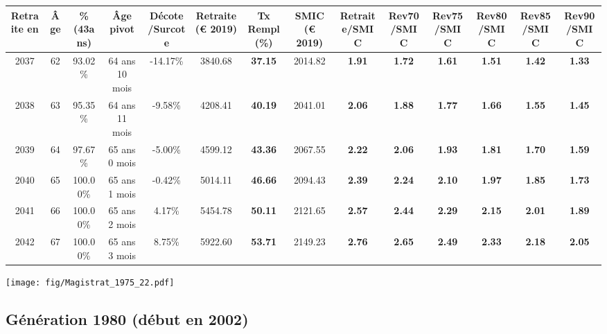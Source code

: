 \begin{adjustbox}{max width=\textwidth} 
\begin{tabular}[htb]{|c|c||c|c|c||c|c||c||c|c|c|c|c|c|} 
\hline 
 Retraite en &  Âge &  \%(43ans) &  Âge pivot &  Décote/Surcote &  Retraite (\euro{} 2019) &  Tx Rempl(\%) &  SMIC (\euro{} 2019) &  Retraite/SMIC &  Rev70/SMIC &  Rev75/SMIC &  Rev80/SMIC &  Rev85/SMIC &  Rev90/SMIC \\ 
\hline \hline 
 2037 &  62 &  93.02\% &  64 ans 10 mois &  -14.17\% &  3840.68 &  {\bf 37.15} &  2014.82 &  {\bf 1.91} &  {\bf 1.72} &  {\bf 1.61} &  {\bf 1.51} &  {\bf 1.42} &  {\bf 1.33} \\ 
\hline 
 2038 &  63 &  95.35\% &  64 ans 11 mois &  -9.58\% &  4208.41 &  {\bf 40.19} &  2041.01 &  {\bf 2.06} &  {\bf 1.88} &  {\bf 1.77} &  {\bf 1.66} &  {\bf 1.55} &  {\bf 1.45} \\ 
\hline 
 2039 &  64 &  97.67\% &  65 ans 0 mois &  -5.00\% &  4599.12 &  {\bf 43.36} &  2067.55 &  {\bf 2.22} &  {\bf 2.06} &  {\bf 1.93} &  {\bf 1.81} &  {\bf 1.70} &  {\bf 1.59} \\ 
\hline 
 2040 &  65 &  100.00\% &  65 ans 1 mois &  -0.42\% &  5014.11 &  {\bf 46.66} &  2094.43 &  {\bf 2.39} &  {\bf 2.24} &  {\bf 2.10} &  {\bf 1.97} &  {\bf 1.85} &  {\bf 1.73} \\ 
\hline 
 2041 &  66 &  100.00\% &  65 ans 2 mois &  4.17\% &  5454.78 &  {\bf 50.11} &  2121.65 &  {\bf 2.57} &  {\bf 2.44} &  {\bf 2.29} &  {\bf 2.15} &  {\bf 2.01} &  {\bf 1.89} \\ 
\hline 
 2042 &  67 &  100.00\% &  65 ans 3 mois &  8.75\% &  5922.60 &  {\bf 53.71} &  2149.23 &  {\bf 2.76} &  {\bf 2.65} &  {\bf 2.49} &  {\bf 2.33} &  {\bf 2.18} &  {\bf 2.05} \\ 
\hline 
\hline 
\end{tabular} 
\end{adjustbox} 
 
 \vspace{0.1cm} 

 \begin{center}\texttt{[image: fig/Magistrat\_1975\_22.pdf]}\end{center} \label{fig/Magistrat_1975_22.pdf} 

\newpage 
 
\subsection{Génération 1980 (début en 2002)} 

